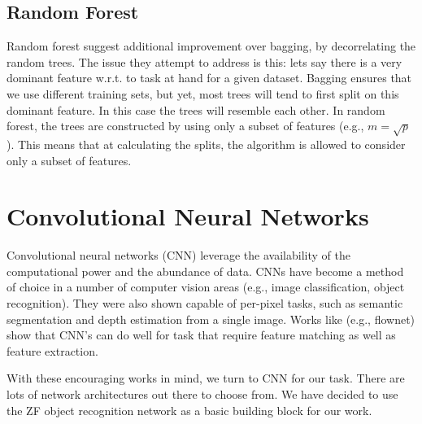 \documentclass{article}
\begin{document}
\subsection{Random Forest}
Random forest suggest additional improvement over bagging, by
decorrelating the random trees.  The issue they attempt to address is
this: lets say there is a very dominant feature w.r.t. to task at hand
for a given dataset.  Bagging ensures that we use different training
sets, but yet, most trees will tend to first split on this dominant
feature.  In this case the trees will resemble each other.  In random
forest, the trees are constructed by using only a subset of features
(e.g., $m = \sqrt{p}$).  This means that at calculating the splits,
the algorithm is allowed to consider only a subset of features.

\section{Convolutional Neural Networks}

Convolutional neural networks (CNN) leverage the availability of the
computational power and the abundance of data.  CNNs have become a
method of choice in a number of computer vision areas (e.g., image
classification, object recognition).  They were also shown capable of
per-pixel tasks, such as semantic segmentation and depth estimation
from a single image. Works like (e.g., flownet) show that CNN's can do
well for task that require feature matching as well as feature
extraction.

With these encouraging works in mind, we turn to CNN for our task.
There are lots of network architectures out there to choose from. We
have decided to use the ZF object recognition network as a basic
building block for our work.
\end{document}
